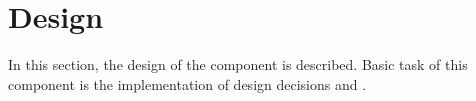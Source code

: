





\section{\COMPcomponentRegistry{} Design}
\label{sec:COMPcomponentRegistryDesign}

In this section, the design of the component \COMPcomponentRegistry{} is described. Basic task of this component is the implementation of design decisions  and .

